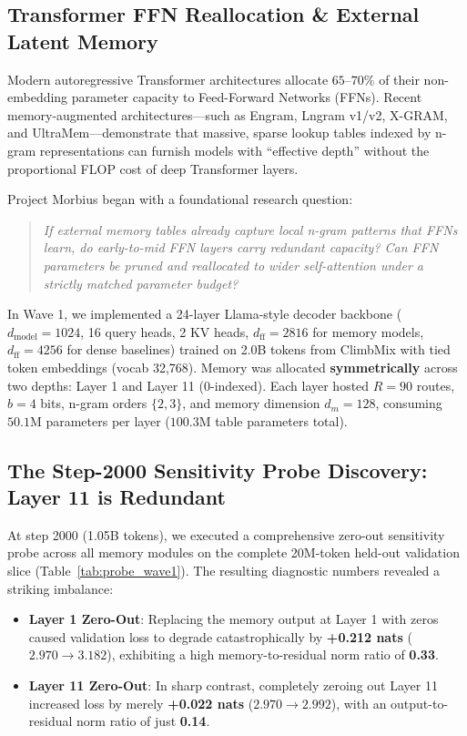 \documentclass[11pt,a4paper]{article}
\begin{document}
\subsection{Transformer FFN Reallocation \& External Latent Memory}
Modern autoregressive Transformer architectures allocate $65\text{--}70\%$ of their non-embedding parameter capacity to Feed-Forward Networks (FFNs). Recent memory-augmented architectures---such as Engram, Lngram v1/v2, X-GRAM, and UltraMem---demonstrate that massive, sparse lookup tables indexed by n-gram representations can furnish models with ``effective depth'' without the proportional FLOP cost of deep Transformer layers.

Project Morbius began with a foundational research question:
\begin{quote}
\emph{If external memory tables already capture local n-gram patterns that FFNs learn, do early-to-mid FFN layers carry redundant capacity? Can FFN parameters be pruned and reallocated to wider self-attention under a strictly matched parameter budget?}
\end{quote}

In Wave 1, we implemented a 24-layer Llama-style decoder backbone ($d_{\text{model}} = 1024$, 16 query heads, 2 KV heads, $d_{\text{ff}} = 2816$ for memory models, $d_{\text{ff}} = 4256$ for dense baselines) trained on 2.0B tokens from ClimbMix with tied token embeddings (vocab 32,768). Memory was allocated \textbf{symmetrically} across two depths: Layer 1 and Layer 11 (0-indexed). Each layer hosted $R = 90$ routes, $b = 4$ bits, n-gram orders $\{2, 3\}$, and memory dimension $d_m = 128$, consuming $50.1$M parameters per layer ($100.3$M table parameters total).

\subsection{The Step-2000 Sensitivity Probe Discovery: Layer 11 is Redundant}
At step 2000 (1.05B tokens), we executed a comprehensive zero-out sensitivity probe across all memory modules on the complete 20M-token held-out validation slice (Table~\ref{tab:probe_wave1}). The resulting diagnostic numbers revealed a striking imbalance:
\begin{itemize}[leftmargin=1.4em, itemsep=2pt]
    \item \textbf{Layer 1 Zero-Out}: Replacing the memory output at Layer 1 with zeros caused validation loss to degrade catastrophically by \textbf{+0.212 nats} ($2.970 \to 3.182$), exhibiting a high memory-to-residual norm ratio of \textbf{0.33}.
    \item \textbf{Layer 11 Zero-Out}: In sharp contrast, completely zeroing out Layer 11 increased loss by merely \textbf{+0.022 nats} ($2.970 \to 2.992$), with an output-to-residual norm ratio of just \textbf{0.14}.
\end{itemize}
\end{document}
